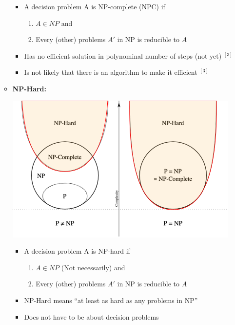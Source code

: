 \documentclass[12pt]{article}
\begin{document}
\begin{enumerate}[1.]
\begin{itemize}
        \begin{itemize}
            \item A decision problem A is NP-complete (NPC) if

            \begin{enumerate}[1)]
                \item $A \in NP$ and
                \item Every (other) problems $A'$ in NP is reducible to $A$
            \end{enumerate}
            \item Has no efficient solution in polynominal number of steps (not yet) $^{[3]}$
            \item Is not likely that there is an algorithm to make it efficient $^{[3]}$
        \end{itemize}

        \item \textbf{NP-Hard:}

        \bigskip

        \begin{center}
        \includegraphics[width=0.7\linewidth]{images/worksheet_7_solution_4.png}
        \end{center}

        \begin{itemize}
            \item A decision problem A is NP-hard if

            \begin{enumerate}[1)]
                \item $A \in NP$ (Not necessarily) and
                \item Every (other) problems $A'$ in NP is reducible to $A$
            \end{enumerate}
            \item NP-Hard means ``at least as hard as any problems in NP''
            \item Does not have to be about decision problems
        \end{itemize}


\end{itemize}
\end{enumerate}
\end{document}
